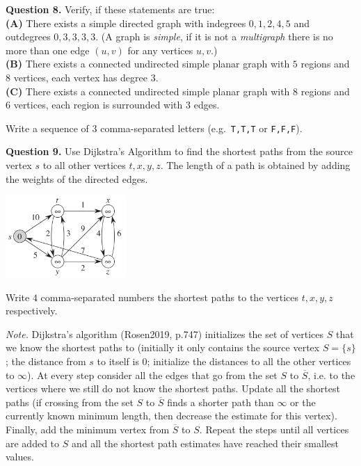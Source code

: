 \documentclass[jou]{apa6}
\begin{document}
\vspace{10pt}
{\bf Question 8.} Verify, if these statements are true:\\
{\bf (A)} There exists a simple directed graph with indegrees $0,1,2,4,5$ and outdegrees $0,3,3,3,3$. (A graph is {\em simple}, if
it is not a {\em multigraph} \textendash{} there is no more than one edge $(u,v)$ for any vertices $u,v$.)\\
{\bf (B)} There exists a connected undirected simple planar graph with $5$ regions and $8$ vertices, each vertex has degree $3$.\\
{\bf (C)} There exists a connected undirected simple planar graph with $8$ regions and $6$ vertices, each region is surrounded 
with $3$ edges.

Write a sequence of 3 comma-separated letters (e.g.\ {\tt T,T,T} or {\tt F,F,F}).



\vspace{10pt}
{\bf Question 9.}
Use Dijkstra’s Algorithm to find the shortest paths from the source vertex $s$ 
to all other vertices $t,x,y,z$. The length of a path is obtained by adding the 
weights of the directed edges.
\begin{center}
\includegraphics[width=1.8in]{dijkstra.png}
\end{center}

Write $4$ comma-separated numbers \textendash{} the shortest paths 
to the vertices $t,x,y,z$ respectively.

{\em Note.} Dijkstra's algorithm (Rosen2019, p.747) initializes the set of vertices $S$ that we 
know the shortest paths to (initially it only contains the 
source vertex $S = \{ s \}$; 
the distance from $s$ to itself is $0$; initialize the distances to 
all the other vertices to $\infty$). At every step consider all the edges that 
go from the set $S$ to $\overline{S}$, i.e. to the vertices where we still 
do not know the shortest paths. Update all the shortest paths (if crossing from 
the set $S$ to $\overline{S}$ finds a shorter path than $\infty$ or the currently 
known minimum length, then decrease the estimate for this vertex). 
Finally, add the minimum vertex from $\overline{S}$ to $S$. Repeat the steps
until all vertices are added to $S$ and all the shortest path estimates have 
reached their smallest values.
\end{document}
